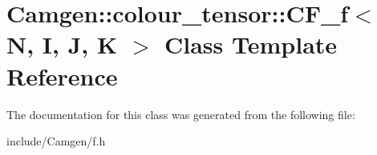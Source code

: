 \hypertarget{a00038}{\section{Camgen\-:\-:colour\-\_\-tensor\-:\-:C\-F\-\_\-f$<$ N, I, J, K $>$ Class Template Reference}
\label{a00038}
}


The documentation for this class was generated from the following file\-:\begin{DoxyCompactItemize}
\item 
include/\-Camgen/f.\-h\end{DoxyCompactItemize}
